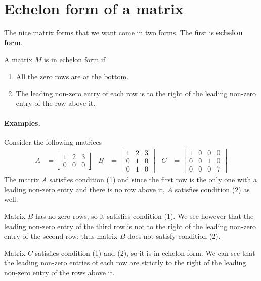 \documentclass[11pt]{article}
\newcommand{\keyphrase}{\textbf}
\begin{document}
\section*{Echelon form of a matrix}
The nice matrix forms that we want come in two forms. The first is \keyphrase{echelon form}.

\begin{minipage}[t]{.95\textwidth}
	A matrix $M$ is in echelon form if
	\begin{enumerate}
		\item{All the zero rows are at the bottom.}
		\item{The leading non-zero entry of each row is to the right of the leading non-zero entry of the row above it.}
	\end{enumerate}
\end{minipage}

\paragraph{Examples.}
Consider the following matrices
\begin{align*}
A &= \begin{bmatrix}
1 & 2 & 3
\\
0 & 0 & 0
\end{bmatrix}
&
B &= \begin{bmatrix}
1 & 2 & 3
\\
0 & 1 & 0
\\
0 & 1 & 0
\end{bmatrix}
&
C &= \begin{bmatrix}
1 & 0 & 0 & 0
\\
0 & 0 & 1 & 0
\\
0 & 0 & 0 & 7
\end{bmatrix}
\end{align*}
The matrix $A$ satisfies condition (1) and since the first row is the only one with a leading non-zero entry and there is no row above it, $A$ satisfies condition (2) as well.

Matrix $B$ has no zero rows, so it satisfies condition (1). We see however that the leading non-zero entry of the third row is not to the right of the leading non-zero entry of the second row; thus matrix $B$ does not satisfy condition (2).

Matrix $C$ satisfies condition (1) and (2), so it is in echelon form. We can see that the leading non-zero entries of each row are strictly to the right of the leading non-zero entry of the rows above it.
\end{document}

